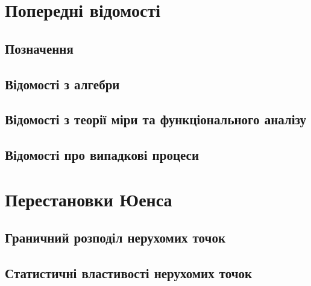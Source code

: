 





\tableofcontents
\chapter{Попередні відомості}
    \section{Позначення}
        
        \newpage
    \section{Відомості з алгебри}
        
    \section{Відомості з теорії міри та функціонального аналізу}
        
    \section{Відомості про випадкові процеси}
        
\chapter{Перестановки Юенса}
    \section{Граничний розподіл нерухомих точок}
        
    \section{Статистичні властивості нерухомих точок}
        
%         
%     
\newpage


